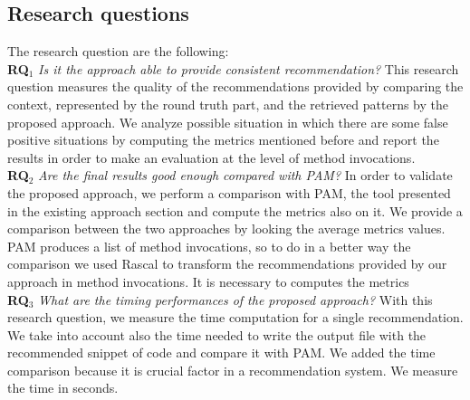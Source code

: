 \subsection{Research questions}
The research question are the following: \\

\textbf{RQ$_1$} \textit{ Is it the approach able to provide consistent recommendation?}
This research question measures the quality of the recommendations provided by comparing the context, represented by the round truth part, and the retrieved patterns by the proposed approach. We analyze possible situation in which there are some false positive situations by computing the metrics mentioned before and report the results in order to make an evaluation at the level of method invocations.\\
\textbf{RQ$_2$} \textit{Are the final results good enough compared with PAM?} In order to validate the proposed approach, we perform a comparison with PAM, the tool presented in the existing approach section and compute the metrics also on it. We provide a comparison between the two approaches by looking the average metrics values. PAM produces a list of method invocations, so to do in a better way the comparison we used Rascal to transform the recommendations provided by our approach in method invocations. It is necessary to computes the metrics\\

\textbf{RQ$_3$} \textit{What are the timing performances of the proposed approach?} With this research question, we measure the time computation for a single recommendation. We take into account also the time needed to write the output file with the recommended snippet of code and compare it with PAM. We added the time comparison because it is crucial factor in a recommendation system. We measure the time in seconds.\\


